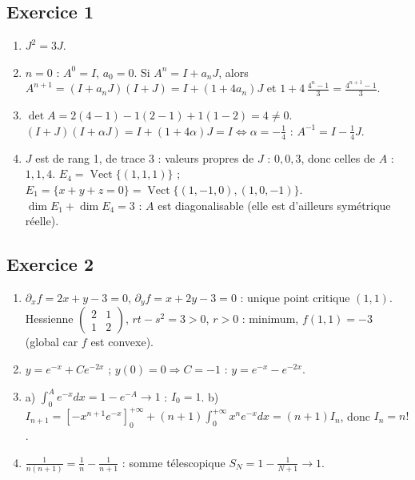 \documentclass[11pt,a4paper]{article}
\begin{document}
\subsection*{Exercice 1}
\begin{enumerate}
  \item $J^2 = 3J$.
  \item $n=0$ : $A^0 = I$, $a_0 = 0$. Si $A^n = I + a_nJ$, alors
  $A^{n+1} = (I + a_nJ)(I + J) = I + (1 + 4a_n)J$ et $1 + 4\,\frac{4^n-1}{3} = \frac{4^{n+1}-1}{3}$.
  \item $\det A = 2(4-1) - 1(2-1) + 1(1-2) = 4 \neq 0$.
  $(I+J)(I+\alpha J) = I + (1 + 4\alpha)J = I \iff \alpha = -\frac14$ : $A^{-1} = I - \frac14 J$.
  \item $J$ est de rang 1, de trace 3 : valeurs propres de $J$ : $0,0,3$, donc celles de $A$ : $1,1,4$.
  $E_4 = \operatorname{Vect}\{(1,1,1)\}$ ; $E_1 = \{x+y+z = 0\} = \operatorname{Vect}\{(1,-1,0),(1,0,-1)\}$.
  $\dim E_1 + \dim E_4 = 3$ : $A$ est diagonalisable (elle est d'ailleurs symétrique réelle).
\end{enumerate}

\subsection*{Exercice 2}
\begin{enumerate}
  \item $\partial_x f = 2x + y - 3 = 0$, $\partial_y f = x + 2y - 3 = 0$ : unique point critique $(1,1)$.
  Hessienne $\begin{pmatrix}2&1\\1&2\end{pmatrix}$, $rt - s^2 = 3 > 0$, $r > 0$ : minimum, $f(1,1) = -3$
  (global car $f$ est convexe).
  \item $y = e^{-x} + Ce^{-2x}$ ; $y(0)=0 \Rightarrow C = -1$ : $y = e^{-x} - e^{-2x}$.
  \item a) $\int_0^A e^{-x}dx = 1 - e^{-A} \to 1$ : $I_0 = 1$.
  b) $I_{n+1} = \left[-x^{n+1}e^{-x}\right]_0^{+\infty} + (n+1)\int_0^{+\infty}x^ne^{-x}dx = (n+1)I_n$,
  donc $I_n = n!$.
  \item $\frac{1}{n(n+1)} = \frac1n - \frac1{n+1}$ : somme télescopique $S_N = 1 - \frac1{N+1} \to 1$.
\end{enumerate}
\end{document}
